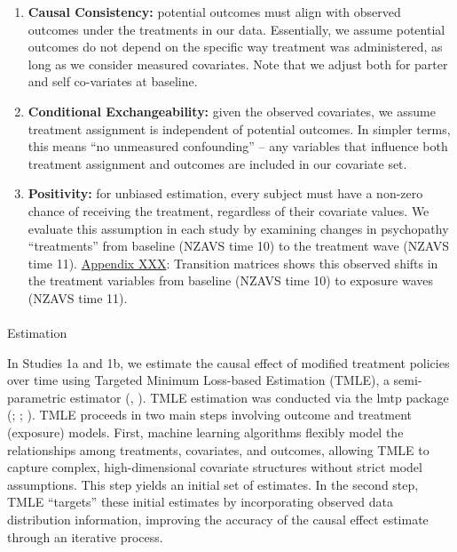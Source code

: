 \documentclass[
  singlecolumn]{article}
\makeatletter
\let\oldparagraph\paragraph
\renewcommand{\paragraph}{
    \@ifstar
      \xxxParagraphStar
      \xxxParagraphNoStar
  }
\newcommand{\xxxParagraphStar}[1]{\oldparagraph*{#1}\mbox{}}
\newcommand{\xxxParagraphNoStar}[1]{\oldparagraph{#1}\mbox{}}
\makeatother
\begin{document}
\begin{enumerate}
\def\labelenumi{\arabic{enumi}.}
\item
  \textbf{Causal Consistency:} potential outcomes must align with
  observed outcomes under the treatments in our data. Essentially, we
  assume potential outcomes do not depend on the specific way treatment
  was administered, as long as we consider measured covariates. Note
  that we adjust both for parter and self co-variates at baseline.
\item
  \textbf{Conditional Exchangeability:} given the observed covariates,
  we assume treatment assignment is independent of potential outcomes.
  In simpler terms, this means ``no unmeasured confounding'' -- any
  variables that influence both treatment assignment and outcomes are
  included in our covariate set.
\item
  \textbf{Positivity:} for unbiased estimation, every subject must have
  a non-zero chance of receiving the treatment, regardless of their
  covariate values. We evaluate this assumption in each study by
  examining changes in psychopathy ``treatments'' from baseline (NZAVS
  time 10) to the treatment wave (NZAVS time 11).
  \href{appendix-transition}{Appendix XXX}: Transition matrices shows
  this observed shifts in the treatment variables from baseline (NZAVS
  time 10) to exposure waves (NZAVS time 11).
\end{enumerate}

\paragraph{Estimation}\label{estimation}

In Studies 1a and 1b, we estimate the causal effect of modified
treatment policies over time using Targeted Minimum Loss-based
Estimation (TMLE), a semi-parametric estimator
(,
). TMLE estimation was conducted via
the lmtp package (;
;
). TMLE proceeds in
two main steps involving outcome and treatment (exposure) models. First,
machine learning algorithms flexibly model the relationships among
treatments, covariates, and outcomes, allowing TMLE to capture complex,
high-dimensional covariate structures without strict model assumptions.
This step yields an initial set of estimates. In the second step, TMLE
``targets'' these initial estimates by incorporating observed data
distribution information, improving the accuracy of the causal effect
estimate through an iterative process.
\end{document}
